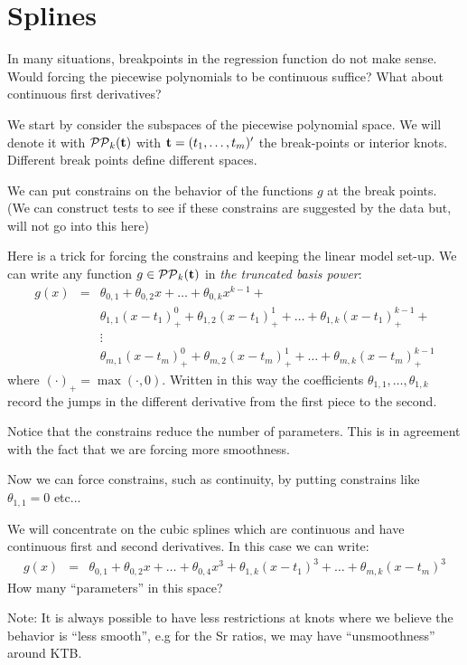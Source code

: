 \section{Splines}
In many situations, breakpoints in the regression function do not make sense.
Would forcing the piecewise polynomials to be continuous suffice? What
about continuous first derivatives? 

We start by consider the subspaces of the piecewise polynomial 
space. We will denote it with ${\cal
  PP}_k({\mathbf t})$ with ${\mathbf t} = (t_1,\dots,t_m)'$ the break-points or
interior knots. Different break points define different spaces.
 
We can put constrains on the behavior of the functions
$g$ at the break points. (We can construct tests to see if these
constrains are suggested by the data but, will not go into this here)

Here is  a trick for forcing the constrains and keeping the linear
model set-up. We can write any function $g \in {\cal PP}_k({\mathbf t})$ in
{\it the truncated basis power}:
\begin{eqnarray*}
g(x) &=& \theta_{0,1} + \theta_{0,2} x + \dots + \theta_{0,k} x^{k-1}
+\\
&\,&  \theta_{1,1}(x-t_1)^0_+ + \theta_{1,2} (x-t_1)^1_+ + \dots +
\theta_{1,k} (x-t_1)^{k-1}_+ +\\
&& \vdots\\
&& \theta_{m,1}(x-t_m)^0_+ + \theta_{m,2} (x-t_m)^1_+ + \dots +
\theta_{m,k} (x-t_m)^{k-1}_+
\end{eqnarray*}
where $(\cdot)_+ = \max(\cdot,0)$. Written in this way the
coefficients $\theta_{1,1},\dots,\theta_{1,k}$ record the jumps in the
different derivative from the first piece to the second. 

Notice that the constrains reduce the number of parameters. This is in
agreement with the fact that we are forcing more smoothness.

Now we can force constrains, such as continuity, by putting constrains
like $\theta_{1,1}=0$ etc... 

We will concentrate on the cubic splines which are continuous
and have continuous first and second derivatives. In this case we can
write:
\begin{eqnarray*}
g(x) &=& \theta_{0,1} + \theta_{0,2} x + \dots + \theta_{0,4} x^3
+ \theta_{1,k} (x-t_1)^{3}+ \dots + \theta_{m,k} (x-t_m)^{3}
\end{eqnarray*}
How many ``parameters'' in this space? 

Note: It is always possible to have less restrictions at knots where we
believe the behavior is ``less smooth'', e.g for the Sr ratios, we
may have ``unsmoothness'' around KTB. 

